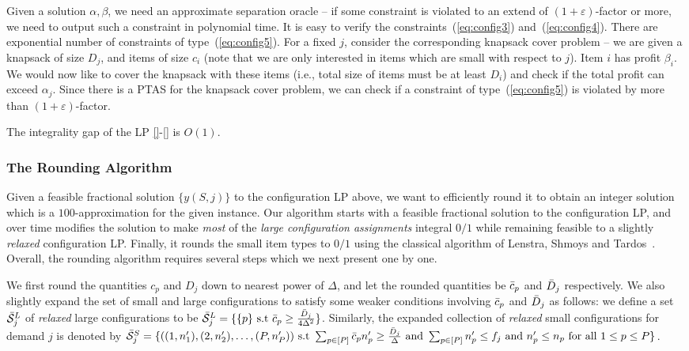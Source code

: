 Given a solution $\alpha, \beta$, we need an approximate separation oracle -- if some constraint is violated to an extend of $(1+\varepsilon)$-factor
or more, we need to output such a constraint in polynomial time. It is easy to verify the constraints~(\ref{eq:config3}) and~(\ref{eq:config4}). There
are exponential number of constraints of type~(\ref{eq:config5}). For a fixed $j$, consider the corresponding knapsack cover problem -- we are given
a knapsack of size $D_j$, and items of size $c_i$ (note that we are only interested in items which are small with respect to $j$). Item $i$ has
profit $\beta_i$. We would now like to cover the knapsack with these items (i.e., total size of items must be at least $D_i$) and check if the total
profit can exceed $\alpha_j$. Since there is a PTAS for the knapsack cover problem, we can check if a constraint of type~(\ref{eq:config5})
is violated by more than $(1+\varepsilon)$-factor.
\fi
\begin{theorem} \label{thm:round-conf}
	The integrality gap of the LP \eqref{}-\eqref{} is $O(1)$.
\end{theorem}

\subsubsection{The Rounding Algorithm}
Given a feasible fractional solution $\{y(S,j)\}$ to the configuration LP above, we want to  efficiently round it to obtain an integer solution which is a $100$-approximation for the given \cckp instance.
Our algorithm starts with a feasible fractional solution to the configuration LP, and over time modifies the solution to make \emph{most} of the \emph{large configuration assignments} integral $0/1$ while remaining feasible to a slightly \emph{relaxed} configuration LP. Finally, it rounds the small item types to $0/1$ using the classical algorithm of Lenstra, Shmoys and Tardos~\cite{LST}. Overall, the rounding algorithm requires several steps which we next present one by one.

\medskip {}
We first round the quantities $c_p$ and $D_j$ down to nearest power of $\Delta$, and let the rounded quantities be ${\bar c}_p$ and ${\bar D}_j$ respectively.
We also slightly expand the set of small and large configurations to satisfy some weaker conditions involving ${\bar c}_p$ and ${\bar D}_j$ as follows: we define a set $\bar{\cal S}^L_j$ of \emph{relaxed} large configurations to be $\bar{\cal S}^L_j = \{ \{p\} \text{ s.t } {\bar c}_p \geq \frac{{\bar D}_j}{4 \Delta^2}  \}$. Similarly, the expanded collection of \emph{relaxed} small configurations for demand $j$ is denoted by $\bar{\cal S}^S_j = \{ ((1,n'_1), (2,n'_2), \ldots, (P,n'_P)) \text{ s.t } \sum_{p \in [P]} {\bar c}_p n'_p \geq \frac{{\bar D}_j}{\Delta} \text{ and } \sum_{p \in [P]} n'_p \leq f_j \text{ and } n'_p \leq n_p \text{ for all } 1 \leq p \leq P \}$.


